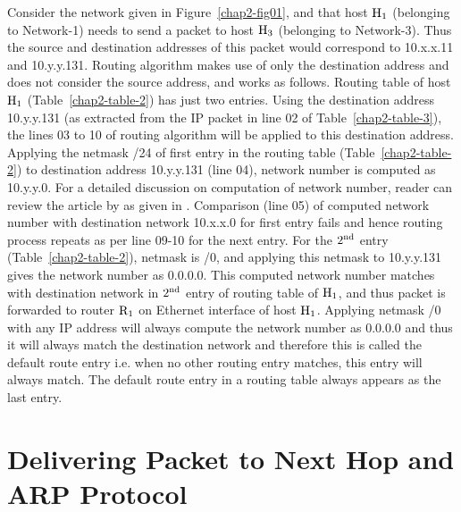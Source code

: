 \begin{multicols}{2}
Consider the network given in Figure~\ref{chap2-fig01}, and that host ${\rm H}_{1}$ (belonging to Network-1) needs to send a packet to host ${\rm H}_{3}$ (belonging to Network-3). Thus the source and destination addresses of this packet would correspond to 10.x.x.11 and 10.y.y.131. Routing algorithm makes use of only the destination address and does not consider the source address, and works as follows. Routing table of host ${\rm H}_{1}$ (Table~\ref{chap2-table-2}) has just two entries. Using the destination address 10.y.y.131 (as extracted from the IP packet in line 02 of Table~\ref{chap2-table-3}), the lines 03 to 10 of routing algorithm will be applied to this destination address. Applying the netmask /24 of first entry in the routing table (Table~\ref{chap2-table-2}) to destination address 10.y.y.131 (line 04), network number is computed as 10.y.y.0. For a detailed discussion on computation of network number, reader can review the article by as given in \cite{art2-key01}. Comparison (line 05) of computed network number with destination network 10.x.x.0 for first entry fails and hence routing process repeats as per line 09-10 for the next entry. For the $2^{\rm nd}$ entry (Table~\ref{chap2-table-2}), netmask is /0, and applying this netmask to 10.y.y.131 gives the network number as 0.0.0.0. This computed network number matches with destination network in $2^{\rm nd}$ entry of routing table of ${\rm H}_{1}$, and thus packet is forwarded to router ${\rm R}_{1}$ on Ethernet interface of host ${\rm H}_{1}$. Applying netmask /0 with any IP address will always compute the network number as 0.0.0.0 and thus it will always match the destination network and therefore this is called the default route entry i.e. when no other routing entry matches, this entry will always match. The default route entry in a routing table always appears as the last entry.

\section{Delivering Packet to Next Hop and ARP Protocol}\label{chap2-sec3}


\end{multicols}
